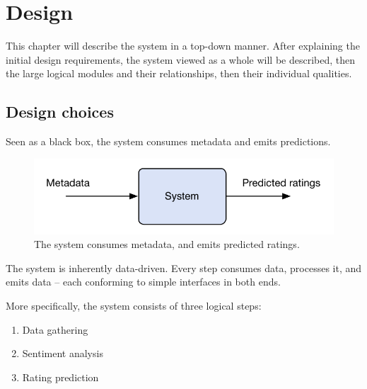 
\chapter{Design} %

\label{Chapter3} %



% 


This chapter will describe the system in a top-down manner. After explaining the initial design requirements, the system viewed as a whole will be described, then the large logical modules and their relationships, then their individual qualities.

\section{Design choices} %
\label{sec:design_choices}

Seen as a black box, the system consumes metadata and emits predictions.

\begin{figure}[h]
  \centering
    \includegraphics{Figures/dataflow}
  \caption{The system consumes metadata, and emits predicted ratings.}
  \label{fig:dataflow}
\end{figure}

The system is inherently data-driven. Every step consumes data, processes it, and emits data -- each conforming to simple interfaces in both ends.

More specifically, the system consists of three logical steps:

\begin{enumerate}
  \item Data gathering
  \item Sentiment analysis
  \item Rating prediction
\end{enumerate}

